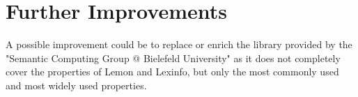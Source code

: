 \section{Further Improvements}
\label{sec:improvements}
A possible improvement could be to replace or enrich the library provided by the "Semantic Computing Group @ Bielefeld University" as it does not completely cover the properties of Lemon and Lexinfo, but only the most commonly used and most widely used properties. 